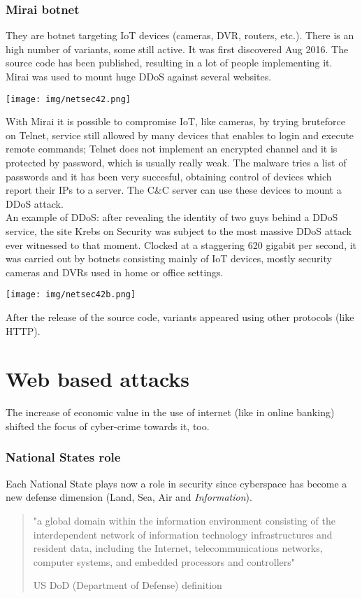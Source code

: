\documentclass[a4paper, 10pt, titlepage]{article}
\begin{document}
\subsubsection{Mirai botnet}
They are botnet targeting IoT devices (cameras, DVR, routers, etc.). There is an high number of variants, some still active. It was first discovered Aug 2016. The source code has been published, resulting in a lot of people implementing it. Mirai was used to mount huge DDoS against several websites.
\begin{center}
	\texttt{[image: img/netsec42.png]}
\end{center}
With Mirai it is possible to compromise IoT, like cameras, by trying bruteforce on Telnet, service still allowed by many devices that enables to login and execute remote commands; Telnet does not implement an encrypted channel and it is protected by password, which is usually really weak. The malware tries a list of passwords and it has been very succesful, obtaining control of devices which report their IPs to a server. The C\&C server can use these devices to mount a DDoS attack.  \medskip\\
An example of DDoS: after revealing the identity of two guys behind a DDoS service, the site Krebs on Security was subject to the most massive DDoS attack ever witnessed to that moment. Clocked at a staggering 620 gigabit per second, it was carried out by botnets consisting mainly of IoT devices, mostly security cameras and DVRs used in home or office settings.
\begin{center}
	\texttt{[image: img/netsec42b.png]}
\end{center}
After the release of the source code, variants appeared using other protocols (like HTTP).



\newpage
\section{Web based attacks}
The increase of economic value in the use of internet (like in online banking) shifted the focus of cyber-crime towards it, too.

\subsubsection*{National States role}
Each National State plays now a role in security since cyberspace has become a new defense dimension (Land, Sea, Air and \textit{Information}). 
\begin{quote}
	"a global domain within the information environment consisting of the interdependent network of information technology infrastructures and resident data, including the Internet, telecommunications networks, computer systems, and embedded processors and controllers"
	\begin{flushright}
		US DoD (Department of Defense) definition
	\end{flushright}
\end{quote}
\end{document}
